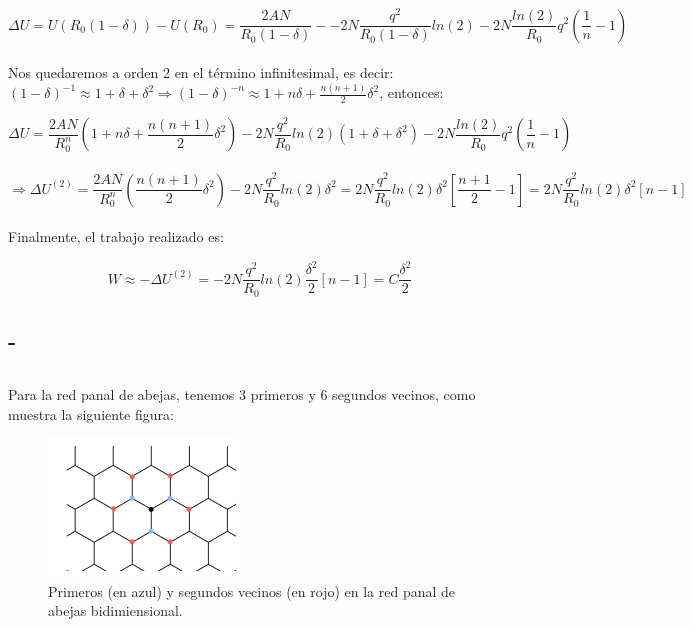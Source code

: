 \documentclass[a4paper]{article}
\begin{document}
$$ \Delta U = U(R_{0}(1 - \delta)) - U(R_{0}) = \frac{2AN}{R_{0}(1 - \delta)} - -2N\frac{q^{2}}{R_{0}(1 - \delta)}ln(2) - 2N\frac{ln(2)}{R_{0}}q^{2}\left(\frac{1}{n} - 1 \right)$$\\

Nos quedaremos a orden 2 en el t\'ermino infinitesimal, es decir: $ (1 - \delta)^{-1} \approx 1 + \delta + \delta^{2} \Rightarrow (1 - \delta)^{-n} \approx 1 + n\delta + \frac{n(n+1)}{2}\delta^{2}$, entonces:

$$ \Delta U = \frac{2AN}{R_{0}^{n}}\left(1 + n\delta + \frac{n(n+1)}{2}\delta^{2}\right) -2N\frac{q^{2}}{R_{0}}ln(2)\left(1 + \delta + \delta^{2}\right) - 2N\frac{ln(2)}{R_{0}}q^{2}\left(\frac{1}{n} - 1 \right)$$\\

$$ \Rightarrow \Delta U^{(2)} = \frac{2AN}{R_{0}^{n}}\left(\frac{n(n+1)}{2}\delta^{2}\right) -2N\frac{q^{2}}{R_{0}}ln(2)\delta^{2} = 2N\frac{q^{2}}{R_{0}}ln(2)\delta^{2}\left[ \frac{n+1}{2} - 1\right] = 2N\frac{q^{2}}{R_{0}}ln(2)\delta^{2}\left[ n - 1\right]$$\\

Finalmente, el trabajo realizado es:

$$ W \approx - \Delta U^{(2)} = -2N\frac{q^{2}}{R_{0}}ln(2)\frac{\delta^{2}}{2}\left[ n - 1\right] = C\frac{\delta^{2}}{2}$$

\subsection{-}
\subsection{}

Para la red panal de abejas, tenemos 3 primeros y 6 segundos vecinos, como muestra la siguiente figura:

\begin{figure}[H]
  \centering
  \includegraphics[width=0.3\linewidth,height=0.2\linewidth]{abejas.png}
  \caption{Primeros (en azul) y segundos vecinos (en rojo) en la red panal de abejas bidimiensional.}
  \label{fig:abejas}
\end{figure}
\end{document}
